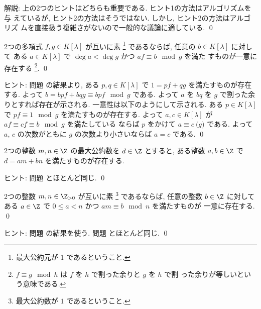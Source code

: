 \documentclass[12pt,twoside]{jarticle}
\begin{document}
\medskip
\noindent
解説: 上の2つのヒントはどちらも重要である.  ヒント1の方法はアルゴリズムを与
えているが, ヒント2の方法はそうではない.  しかし, ヒント2の方法はアルゴリズ
ムを直接扱う複雑さがないので一般的な議論に適している.
\qed


\begin{question}
\label{q:U(K[z]/(g))} 
  2つの多項式 $f,g\in K[\lambda]$ が互いに素%
  \footnote{最大公約元が $1$ であるということ.}
  であるならば, 任意の $b\in K[\lambda]$ に対して
  ある $a\in K[\lambda]$ で $\deg a<\deg g$ かつ $af\equiv b\mod{g}$ を満た
  すものが一意に存在する%
  \footnote{$f\equiv g\mod{h}$ は $f$ を $h$ で割った余りと $g$ を $h$ で割
    った余りが等しいという意味である.}.
  \qed
\end{question}

\noindent
ヒント: 問題  の結果より, 
ある $p,q\in K[\lambda]$ で $1=pf+qg$ を満たすものが存在する.
よって $b=bpf+bqg\equiv bpf \mod{g}$ である.
よって $a$ を $bq$ を $g$ で割った余りとすれば存在が示される.
一意性は以下のようにして示される.
ある $p\in K[\lambda]$ で $pf\equiv 1\mod{g}$ を満たすものが存在する.
よって $a,c\in K[\lambda]$ が $af\equiv cf\equiv b\mod{g}$ を満たしている
ならば $p$ をかけて $a\equiv c\pod{g}$ である.  
よって $a$, $c$ の次数がともに $g$ の次数より小さいならば $a=c$ である.
\qed


\begin{question}
\label{q:Eucledean-algorith-2-Z}
  2つの整数 $m,n\in\Z$ の最大公約数を $d\in\Z$ とすると,
  ある整数 $a,b\in\Z$ で $d = am + bn$ を満たすものが存在する. 
\end{question}

\noindent
ヒント: 問題  とほとんど同じ.
\qed


\begin{question}
\label{q:U(Z/mZ)} 
  2つの整数 $m,n\in\Z_{>0}$ が互いに素%
  \footnote{最大公約数が $1$ であるということ.}
  であるならば, 任意の整数 $b\in\Z$ に対して
  ある $a\in\Z$ で $0\le a<n$ かつ $am\equiv b\mod{n}$ を満たすものが
  一意に存在する.
  \qed
\end{question}

\noindent
ヒント: 問題  の結果を使う. 
問題  とほとんど同じ.
\qed
\end{document}
